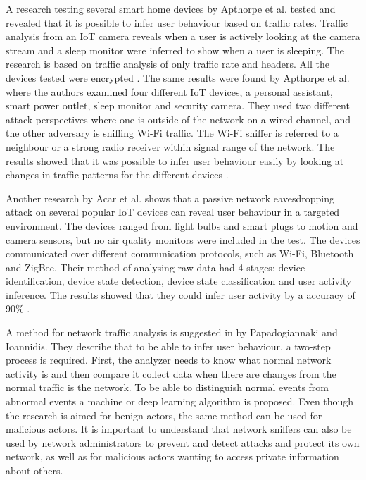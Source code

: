 A research testing several smart home devices by Apthorpe et al. \cite{SpyingonSmartHomes} tested and revealed that it is possible to infer user behaviour based on traffic rates. Traffic analysis from an \gls{IoT} camera reveals when a user is actively looking at the camera stream and a sleep monitor were inferred to show when a user is sleeping. The research is based on traffic analysis of only traffic rate and headers. All the devices tested were encrypted \cite{SpyingonSmartHomes}. The same results were found by Apthorpe et al.\cite{WiFiSniffInfer} where the authors examined four different \gls{IoT} devices, a personal assistant, smart power outlet, sleep monitor and security camera. They used two different attack perspectives where one is outside of the network on a wired channel, and the other adversary is sniffing \gls{Wi-Fi} traffic. The \gls{Wi-Fi} sniffer is referred to a neighbour or a strong radio receiver within signal range of the network. The results showed that it was possible to infer user behaviour easily by looking at changes in traffic patterns for the different devices \cite{WiFiSniffInfer}. 

Another research by Acar et al. \cite{PeakaBoo} shows that a passive network eavesdropping attack on several popular \gls{IoT} devices can reveal user behaviour in a targeted environment. The devices ranged from light bulbs and smart plugs to motion and camera sensors, but no air quality monitors were included in the test. The devices communicated over different communication protocols, such as \gls{Wi-Fi}, Bluetooth and ZigBee. Their method of analysing raw data had 4 stages: device identification, device state detection, device state classification and user activity inference. The results showed that they could infer user activity by a accuracy of 90\% \cite{PeakaBoo}. 

A method for network traffic analysis is suggested in \cite{NetAna} by Papadogiannaki and Ioannidis. They describe that to be able to infer user behaviour, a two-step process is required. First, the analyzer needs to know what normal network activity is and then compare it collect data when there are changes from the normal traffic is the network. To be able to distinguish normal events from abnormal events a machine or deep learning algorithm is proposed. Even though the research is aimed for benign actors, the same method can be used for malicious actors. It is important to understand that network sniffers can also be used by network administrators to prevent and detect attacks and protect its own network, as well as for malicious actors wanting to access private information about others. 